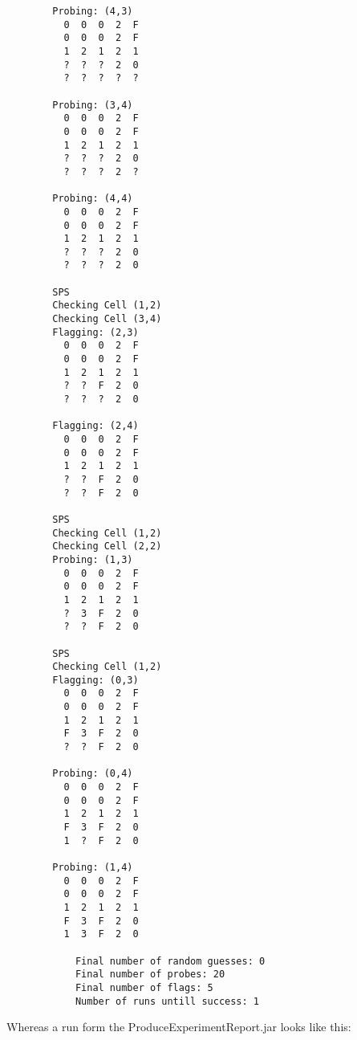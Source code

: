 \documentclass[british]{article}
\begin{document}
\begin{lstlisting}
		Probing: (4,3)
		  0  0  0  2  F
		  0  0  0  2  F
		  1  2  1  2  1
		  ?  ?  ?  2  0
		  ?  ?  ?  ?  ?

		Probing: (3,4)
		  0  0  0  2  F
		  0  0  0  2  F
		  1  2  1  2  1
		  ?  ?  ?  2  0
		  ?  ?  ?  2  ?

		Probing: (4,4)
		  0  0  0  2  F
		  0  0  0  2  F
		  1  2  1  2  1
		  ?  ?  ?  2  0
		  ?  ?  ?  2  0

		SPS
		Checking Cell (1,2)
		Checking Cell (3,4)
		Flagging: (2,3)
		  0  0  0  2  F
		  0  0  0  2  F
		  1  2  1  2  1
		  ?  ?  F  2  0
		  ?  ?  ?  2  0

		Flagging: (2,4)
		  0  0  0  2  F
		  0  0  0  2  F
		  1  2  1  2  1
		  ?  ?  F  2  0
		  ?  ?  F  2  0

		SPS
		Checking Cell (1,2)
		Checking Cell (2,2)
		Probing: (1,3)
		  0  0  0  2  F
		  0  0  0  2  F
		  1  2  1  2  1
		  ?  3  F  2  0
		  ?  ?  F  2  0

		SPS
		Checking Cell (1,2)
		Flagging: (0,3)
		  0  0  0  2  F
		  0  0  0  2  F
		  1  2  1  2  1
		  F  3  F  2  0
		  ?  ?  F  2  0

		Probing: (0,4)
		  0  0  0  2  F
		  0  0  0  2  F
		  1  2  1  2  1
		  F  3  F  2  0
		  1  ?  F  2  0

		Probing: (1,4)
		  0  0  0  2  F
		  0  0  0  2  F
		  1  2  1  2  1
		  F  3  F  2  0
		  1  3  F  2  0

			Final number of random guesses: 0
			Final number of probes: 20
			Final number of flags: 5
			Number of runs untill success: 1

\end{lstlisting}
 Whereas a run form the ProduceExperimentReport.jar looks like this:
\end{document}
